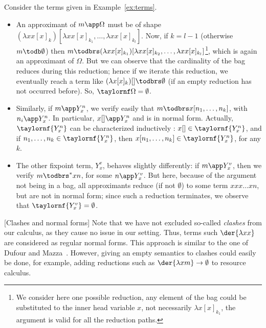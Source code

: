 \begin{example}\label{ex:terms_app} Consider the terms given in Example~\ref{ex:terms}.
	\begin{itemize}
		\item An approximant of $m\app\Omega$ must be of shape $(\lambda x
			x[x]_k)[\lambda x x[x]_{k_1},\dots ,\lambda x x[x]_{k_l}]$.
			Now, if $k=l-1$ (otherwise $m\todb \emptyset$) then $m\todbrs (\lambda x
			x[x]_{k_1})[\lambda x x[x]_{k_2},\dots ,\lambda x
			x[x]_{k_l}]$\footnote{
				We consider here one possible reduction, any
				element of the bag could be substituted to the
				inner head variable $x$, not necessarily $\lambda
				x[x]_{k_1}$, the argument is valid for all the
				reduction paths.
			}, which is again an approximant of $\Omega$. But we can
			observe that the cardinality of the bag reduces during
			this reduction; hence if we iterate this reduction, we
			eventually reach a term like $(\lambda
			x[x]_k)[]\todbrs\emptyset$ (if an empty reduction has
			not occurred before). So, $\taylornf\Omega=\emptyset$.
		\item Similarly, if $m\app Y^n_x$, we verify easily that
			$m\todbrs x[n_1,\dots ,n_k]$, with $n_i\app Y^n_x$. In
			particular, $x[]\app Y^n_x$ and is in normal form.
			Actually, $\taylornf{Y^n_x}$ can be characterized
			inductively : $x[]\in\taylornf{Y^n_x}$, and if
			$n_1,\dots ,n_k\in \taylornf{Y^n_x}$, then
			$x[n_1,\dots ,n_k]\in\taylornf{Y^n_x}$, for any $k$.
		\item The other fixpoint term, $Y^v_x$, behaves slightly
			differently: if $m\app Y^v_x$, then we verify
			$m\todbrs^* xn$, for some $n\app Y^v_x$. But here,
			because of the argument not being in a bag, all
			approximants reduce (if not $\emptyset$) to some term
			$xxx\dots  xn$, but are not in normal form; since such a
			reduction terminates, we observe that
			$\taylornf{Y^v_x}=\emptyset$.
	\end{itemize}

\end{example}
\begin{remark}\label{rem:clashes}[Clashes and normal forms]
	Note that we have not excluded so-called \emph{clashes} from our calculus,
	as they cause no issue in our setting. Thus, terms such $\der{\lambda xx}$ are considered as
	regular normal forms. This approach is similar to the one of Dufour and
	Mazza~\cite{mazza-dufour}. However, giving an empty semantics to clashes could
	easily be done, for example, adding reductions such as $\der{\lambda
	xm}\to\emptyset$ to resource calculus.
\end{remark}

